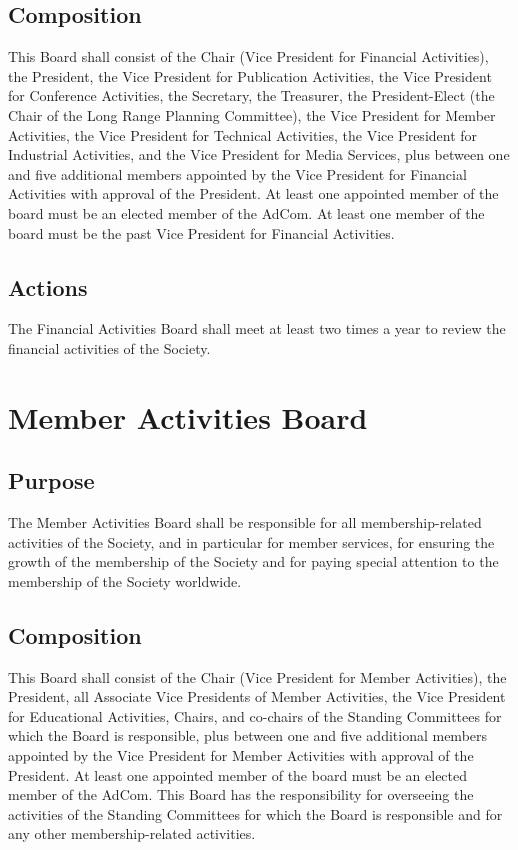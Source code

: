 \documentclass[10pt]{article}
\begin{document}
\subsection{Composition}
This Board shall consist of the Chair (Vice President for Financial Activities), the President, the Vice President for Publication Activities, the Vice President for Conference Activities, the Secretary, the Treasurer, the President-Elect (the Chair of the Long Range Planning Committee), the Vice President for Member Activities, the Vice President for Technical Activities, the Vice President for Industrial Activities, and the Vice President for Media Services, plus between one and five additional members appointed by the Vice President for Financial Activities with approval of the President. At least one appointed member of the board must be an elected member of the AdCom. At least one member of the board must be the past Vice President for Financial Activities.


\subsection{Actions}
The Financial Activities Board shall meet at least two times a year to review the financial activities of the Society. 


\section{Member Activities Board}
\label{MAB}
\subsection{Purpose}
The Member Activities Board shall be responsible for all membership-related activities of the Society, and in particular for member services, for ensuring the growth of the membership of the Society and for paying special attention to the membership of the Society worldwide.

\subsection{Composition}
This Board shall consist of the Chair (Vice President for Member Activities), the President, all Associate Vice Presidents of Member Activities, the Vice President for Educational Activities, Chairs, and co-chairs of the Standing Committees for which the Board is responsible, plus between one and five additional members appointed by the Vice President for Member Activities with approval of the President. At least one appointed member of the board must be an elected member of the AdCom. This Board has the responsibility for overseeing the activities of the Standing Committees for which the Board is responsible and for any other membership-related activities.
\end{document}
